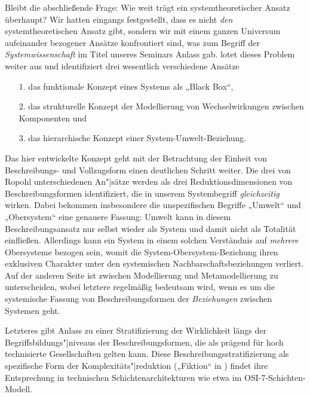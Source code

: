 \documentclass[12pt,a4paper]{article}
\begin{document}
Bleibt die abschließende Frage: Wie weit trägt ein systemtheoretischer Ansatz
überhaupt? Wir hatten eingangs festgestellt, dass es nicht \emph{den}
systemtheoretischen Ansatz gibt, sondern wir mit einem ganzen Universum
aufeinander bezogener Ansätze konfrontiert sind, was zum Begriff der
\emph{Systemwissenschaft} im Titel unseres Seminars \cite{Graebe2020a} Anlass
gab.  \cite{Ropohl2009} lotet dieses Problem weiter aus und identifiziert drei
wesentlich verschiedene Ansätze
\begin{itemize}
\item[1.] das funktionale Konzept eines Systems als „Black Box“,
\item[2.] das strukturelle Konzept der Modellierung von Wechselwirkungen
  zwischen Komponenten und
\item[3.] das hierarchische Konzept einer System-Umwelt-Beziehung.
\end{itemize}
Das hier entwickelte Konzept geht mit der Betrachtung der Einheit von
Beschreibungs- und Vollzugsform einen deutlichen Schritt weiter. Die drei von
Ropohl unterschiedenen An"|sätze werden als drei Reduktionsdimensionen von
Beschreibungsformen identifiziert, die in unserem Systembegriff
\emph{gleichzeitig} wirken. Dabei bekommen insbesondere die unspezifischen
Begriffe „Umwelt“ und „Obersystem“ eine genauere Fassung: Umwelt kann in
diesem Beschreibungsansatz nur selbst wieder als System und damit nicht als
Totalität einfließen.  Allerdings kann ein System in einem solchen Verständnis
auf \emph{mehrere} Obersysteme bezogen sein, womit die
System-Obersystem-Beziehung ihren exklusiven Charakter unter den systemischen
Nachbarschaftsbeziehungen verliert. Auf der anderen Seite ist zwischen
Modellierung und Metamodellierung zu unterscheiden, wobei letztere regelmäßig
bedeutsam wird, wenn es um die systemische Fassung von Beschreibungsformen der
\emph{Beziehungen} zwischen Systemen geht.

Letzteres gibt Anlass zu einer Stratifizierung der Wirklichkeit längs der
Begriffsbildungs"|\mbox{niveaus} der Beschreibungsformen, die als prägend für
hoch technisierte Gesellschaften gelten kann.  Diese
Beschreibungsstratifizierung als spezifische Form der Komplexitäts"|reduktion
(„Fiktion“ in \cite{Graebe2020b}) findet ihre Entsprechung in technischen
Schichtenarchitekturen wie etwa im OSI-7-Schichten-Modell.
\end{document}
